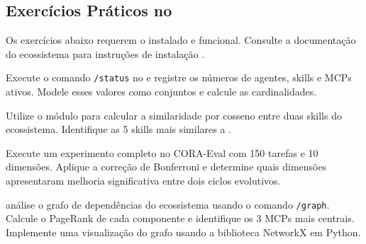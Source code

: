 \subsection{Exercícios Práticos no \opencodeeco{}}
Os exercícios abaixo requerem o \opencodeeco{} instalado e funcional.
Consulte a documentação do ecossistema para instruções de instalação
\cite{opencode2026ecosystem}.
\begin{exercicio}
Execute o comando \lstinline{/status} no \opencodeeco{} e registre os
números de agentes, skills e MCPs ativos. Modele esses valores como
conjuntos e calcule as cardinalidades.
\end{exercicio}
\begin{exercicio}
Utilize o módulo  para calcular a
similaridade por cosseno entre duas skills do ecossistema. Identifique
as 5 skills mais similares a .
\end{exercicio}
\begin{exercicio}
Execute um experimento completo no CORA-Eval com 150 tarefas e 10
dimensões. Aplique a correção de Bonferroni e determine quais dimensões
apresentaram melhoria significativa entre dois ciclos evolutivos.
\end{exercicio}
\begin{exercicio}
análise o grafo de dependências do ecossistema usando o comando
\lstinline{/graph}. Calcule o PageRank de cada componente e identifique
os 3 MCPs mais centrais. Implemente uma visualização do grafo usando
a biblioteca NetworkX em Python.
\end{exercicio}
